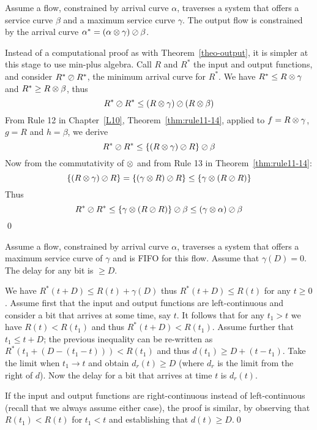 \begin{theorem}
Assume a flow, constrained by arrival curve $\alpha$, traverses a
system that offers a service curve $\beta$ and a maximum service
curve $\gamma$. The output flow is constrained by the arrival
curve $\alpha^{*}=(\alpha \otimes \gamma) \oslash \beta$.
\end{theorem}
\pr
Instead of a computational proof as with
Theorem~\ref{theo-output}, it is simpler at this stage to use
min-plus algebra. Call $R$ and $R^*$ the input and output
functions, and consider $R^* \oslash R^*$, the minimum arrival curve
for $R^*$. We have $R^* \leq R \otimes \gamma$ and $R^* \geq R \otimes
\beta$, thus
$$R^* \oslash R^* \leq (R \otimes \gamma) \oslash (R \otimes
\beta)
 $$
From Rule 12 in Chapter~\ref{L10}, Theorem~\ref{thm:rule11-14},
applied to $f=R \otimes \gamma$, $g=R$ and $h=\beta$, we derive
$$R^* \oslash R^* \leq \left\{(R \otimes \gamma) \oslash R \right\} \oslash \beta
 $$
Now from the commutativity of $\otimes$ and from Rule 13 in
Theorem~\ref{thm:rule11-14}:
$$ \left\{(R \otimes \gamma) \oslash R \right\} =
 \left\{(\gamma \otimes R) \oslash R \right\}
 \leq \left\{ \gamma \otimes (R \oslash R )\right\}
 $$
Thus
$$R^* \oslash R^* \leq \left\{ \gamma \otimes (R \oslash R )\right\} \oslash
\beta \leq ( \gamma \otimes \alpha ) \oslash \beta
 $$
 \qed


\begin{theorem}
Assume a flow, constrained by arrival curve $\alpha$, traverses a
system that offers a maximum service curve of $\gamma$ and is FIFO for this flow.  Assume
that $\gamma(D)=0$. %
The delay for any bit is $\geq D$.
\end{theorem}
\pr We have $R^*(t+D) \leq R(t) + \gamma(D)$ thus $R^*(t+D) \leq
R(t)$ for any $t\geq 0$. Assume first that the input and output functions are left-continuous and consider a bit that arrives at some time, say $t$. It follows that for any $t_1>t$ we have $R(t)<R(t_1)$ and thus $R^*(t+D) <R(t_1)$. Assume further that $t_1\leq t+D$; the previous inequality can be re-written as $R^*(t_1+(D-(t_1-t))) <R(t_1)$ and thus $d(t_1)\geq D+(t-t_1)$. Take the limit when $t_1\to t$ and obtain $d_r(t)\geq D$ (where $d_r$ is the limit from the right of $d$). Now the delay for a bit that arrives at time $t$ is $d_r(t)$.

If the input and output functions are right-continuous instead of left-continuous (recall that we always assume either case), the proof is similar, by observing that $R(t_1)<R(t)$ for $t_1<t$ and establishing that $d(t)\geq D$.\qed

